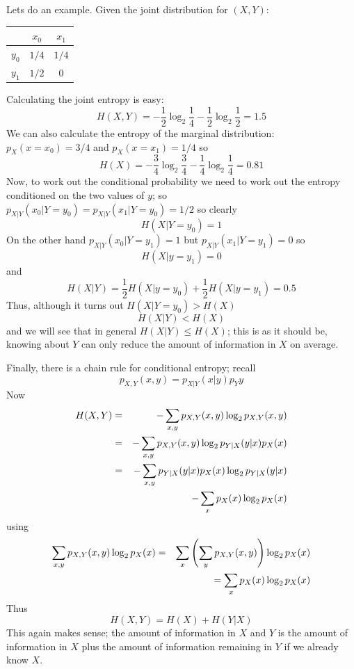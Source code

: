 \documentclass[12pt]{article}
\begin{document}
Lets do an example. Given the joint distribution for $(X,Y)$:
\begin{center}
\begin{tabular}{c|cc}
&$x_0$&$x_1$\\
\hline
$y_0$&$1/4$&$1/4$\\
$y_1$&$1/2$&$0$
\end{tabular}
\end{center}
Calculating the joint entropy is easy:
\begin{equation}
H(X,Y)=-\frac{1}{2}\log_2{\frac{1}{4}}-\frac{1}{2}\log_2{\frac{1}{2}}=1.5
\end{equation}
We can also calculate the entropy of the marginal distribution: $p_X(x=x_0)=3/4$ and $p_X(x=x_1)=1/4$ so
\begin{equation}
H(X)=-\frac{3}{4}\log_2{\frac{3}{4}}-\frac{1}{4}\log_2{\frac{1}{4}}=0.81
\end{equation}
Now, to work out the conditional probability we need to work out the
entropy conditioned on the two values of $y$; so
$p_{X|Y}(x_0|Y=y_0)=p_{X|Y}(x_1|Y=y_0)=1/2$ so clearly
\begin{equation}
H(X|Y=y_0)=1
\end{equation}
On the other hand $p_{X|Y}(x_0|Y=y_1)=1$ but $p_{X|Y}(x_1|Y=y_1)=0$ so
\begin{equation}
H(X|y=y_1)=0
\end{equation}
and
\begin{equation}
H(X|Y)=\frac{1}{2}H(X|y=y_0)+\frac{1}{2}H(X|y=y_1)=0.5
\end{equation}
Thus, although it turns out $H(X|Y=y_0)>H(X)$
\begin{equation}
H(X|Y)<H(X)
\end{equation}
and we will see that in general $H(X|Y)\le H(X)$; this is as it should
be, knowing about $Y$ can only reduce the amount of information in $X$
on average.

Finally, there is a chain rule for conditional entropy; recall
\begin{equation}
p_{X,Y}(x,y)=p_{X|Y}(x|y)p_Y{y}
\end{equation}
Now
\begin{eqnarray}
H(X,Y)&=&-\sum_{x,y} p_{X,Y}(x,y)\log_2{p_{X,Y}(x,y)}\cr
&=&-\sum_{x,y} p_{X,Y}(x,y)\log_2{p_{Y|X}(y|x)p_X(x)}\cr
&=&-\sum_{x,y} p_{Y|X}(y|x)p_X(x)\log_2{p_{Y|X}(y|x)}\cr&&-\sum_x p_{X}(x)\log_2{p_X(x)}
\end{eqnarray}
using
\begin{eqnarray}
\sum_{x,y}p_{X,Y}(x,y)\log_2{p_X(x)}&=&\sum_{x}\left(\sum_y p_{X,Y}(x,y)\right)\log_2{p_X(x)}\cr &&=\sum_x p_{X}(x)\log_2{p_X(x)}
\end{eqnarray}
Thus
\begin{equation}
H(X,Y)=H(X)+H(Y|X)
\end{equation}
This again makes sense; the amount of information in $X$ and $Y$ is
the amount of information in $X$ plus the amount of information
remaining in $Y$ if we already know $X$.
\end{document}
